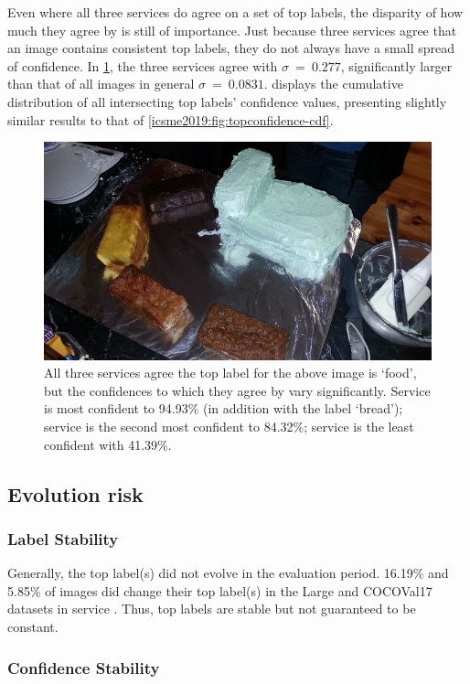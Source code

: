 Even where all three services do agree on a set of top labels, the disparity of how much they agree by is still of importance. Just because three services agree that an image contains consistent top labels, they do not always have a small spread of confidence. In \cref{icsme2019:fig:sample-images:cake}, the three services agree with $\sigma~=~0.277$, significantly larger than that of all images in general $\sigma~=~0.0831$.  displays the cumulative distribution of all intersecting top labels' confidence values, presenting slightly similar results to that of \cref{icsme2019:fig:topconfidence-cdf}.

\begin{figure}
  \centering
  \includegraphics[width=0.55\linewidth]{000000095707}    
  \caption[Agreement of labels between multiple computer vision services do not share similar confidences]{All three services agree the top label for the above image is `food', but the confidences to which they agree by vary significantly. Service \awsapi{} is most confident to 94.93\% (in addition with the label `bread'); service \googleapi{} is the second most confident to 84.32\%; service \azureapi{} is the least confident with 41.39\%.}
  \label{icsme2019:fig:sample-images:cake}
\end{figure}

\subsection{Evolution risk}

\subsubsection{Label Stability}

Generally, the top label(s) did not evolve in the evaluation period. 16.19\% and 5.85\% of images did change their top label(s) in the Large and COCOVal17 datasets in service \googleapi{}. Thus, top labels are stable but not guaranteed to be constant.

\subsubsection{Confidence Stability}

